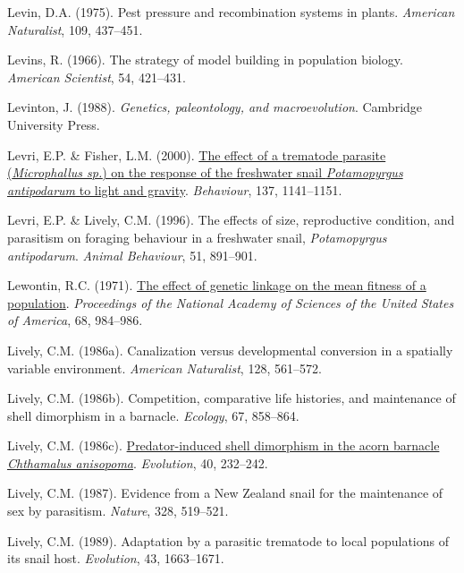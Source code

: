 \documentclass[
  letterpaper,
]{book}
\newlength{\cslhangindent}
\newenvironment{CSLReferences}[2] %
 {\begin{list}{}{%
  \setlength{\itemindent}{0pt}
  \setlength{\leftmargin}{0pt}
  \setlength{\parsep}{0pt}
  \ifodd #1
   \setlength{\leftmargin}{\cslhangindent}
   \setlength{\itemindent}{-1\cslhangindent}
  \fi
  \setlength{\itemsep}{#2\baselineskip}}}
 {\end{list}}
\begin{document}
\begin{CSLReferences}{1}{0}
Levin, D.A. (1975). Pest pressure and recombination systems in plants.
\emph{American Naturalist}, 109, 437--451.

Levins, R. (1966). The strategy of model building in population biology.
\emph{American Scientist}, 54, 421--431.

Levinton, J. (1988). \emph{Genetics, paleontology, and macroevolution}.
Cambridge University Press.

Levri, E.P. \& Fisher, L.M. (2000).
\href{https://doi.org/10.1163/156853900502565}{The effect of a trematode
parasite (\emph{{M}icrophallus sp.}) {o}n the response of the freshwater
snail \emph{{P}otamopyrgus antipodarum} to light and gravity}.
\emph{Behaviour}, 137, 1141--1151.

Levri, E.P. \& Lively, C.M. (1996). The effects of size, reproductive
condition, and parasitism on foraging behaviour in a freshwater snail,
\emph{{P}otamopyrgus antipodarum}. \emph{Animal Behaviour}, 51,
891--901.

Lewontin, R.C. (1971). \href{https://doi.org/10.1073/pnas.68.5.984}{The
effect of genetic linkage on the mean fitness of a population}.
\emph{Proceedings of the National Academy of Sciences of the United
States of America}, 68, 984--986.

Lively, C.M. (1986a). Canalization versus developmental conversion in a
spatially variable environment. \emph{American Naturalist}, 128,
561--572.

Lively, C.M. (1986b). Competition, comparative life histories, and
maintenance of shell dimorphism in a barnacle. \emph{Ecology}, 67,
858--864.

Lively, C.M. (1986c).
\href{https://doi.org/10.1111/j.1558-5646.1986.tb00466.x}{Predator-induced
shell dimorphism in the acorn barnacle \emph{{C}hthamalus anisopoma}}.
\emph{Evolution}, 40, 232--242.

Lively, C.M. (1987). Evidence from a {New Zealand} snail for the
maintenance of sex by parasitism. \emph{Nature}, 328, 519--521.

Lively, C.M. (1989). Adaptation by a parasitic trematode to local
populations of its snail host. \emph{Evolution}, 43, 1663--1671.


\end{CSLReferences}
\end{document}
